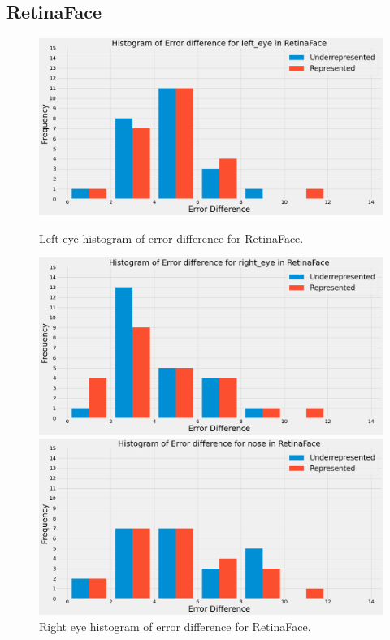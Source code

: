 \documentclass{l4proj}
\begin{document}
\subsection{RetinaFace}
\begin{figure}[h!]
  \centering
  \begin{minipage}{0.49\textwidth}
    \includegraphics[width=\textwidth]{images/retinaface_lefteye.png}
    \caption{Left eye histogram of error difference for RetinaFace.}
    \label{retinaface_lefteye}
  \end{minipage}
  \hfill
  \begin{minipage}{0.49\textwidth}
    \includegraphics[width=\textwidth]{images/retinaface_righteye.png}
    \caption{Right eye histogram of error difference for RetinaFace.}
    \label{retinaface_righteye}
  \end{minipage}
  \hfill
  \begin{minipage}{0.51\textwidth}
    \includegraphics[width=\textwidth]{images/retinaface_nose.png}

\end{minipage}
\end{figure}
\end{document}
